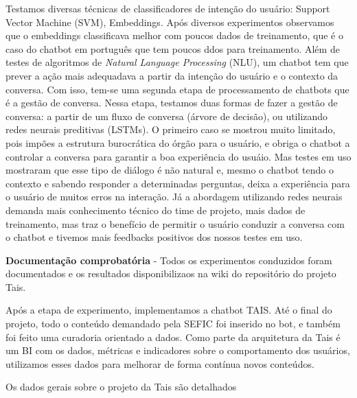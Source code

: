 Testamos diversas técnicas de classificadores de intenção do usuário:
Support Vector Machine (SVM), Embeddings. Após diversos experimentos
observamos que o embeddings classificava melhor com poucos dados de
treinamento, que é o caso do chatbot em português que tem poucos ddos
para treinamento. Além de testes de algoritmos de \emph{Natural Language
Processing} (NLU), um chatbot tem que prever a ação mais adequadava a
partir da intenção do usuário e o contexto da conversa. Com isso, tem-se
uma segunda etapa de processamento de chatbots que é a gestão de
conversa. Nessa etapa, testamos duas formas de fazer a gestão de
conversa: a partir de um fluxo de conversa (árvore de decisão), ou
utilizando redes neurais preditivas (LSTMs). O primeiro caso se mostrou
muito limitado, pois impões a estrutura burocrática do órgão para o
usuário, e obriga o chatbot a controlar a conversa para garantir a boa
experiência do usuáio. Mas testes em uso mostraram que esse tipo de
diálogo é não natural e, mesmo o chatbot tendo o contexto e sabendo
responder a determinadas perguntas, deixa a experiência para o usuário
de muitos erros na interação. Já a abordagem utilizando redes neurais
demanda mais conhecimento técnico do time de projeto, mais dados de
treinamento, mas traz o benefício de permitir o usuário conduzir a
conversa com o chatbot e tivemos mais feedbacks positivos dos nossos
testes em uso.

\textbf{Documentação comprobatória} - Todos os experimentos conduzidos
foram documentados e os resultados disponibilizaos na wiki do
repositório do projeto Tais.

Após a etapa de experimento, implementamos a chatbot TAIS. Até o final
do projeto, todo o conteúdo demandado pela SEFIC foi inserido no bot, e
também foi feito uma curadoria orientado a dados. Como parte da
arquitetura da Tais é um BI com os dados, métricas e indicadores sobre o
comportamento dos usuários, utilizamos esses dados para melhorar de
forma contínua novos conteúdos.

Os dados gerais sobre o projeto da Tais são detalhados

